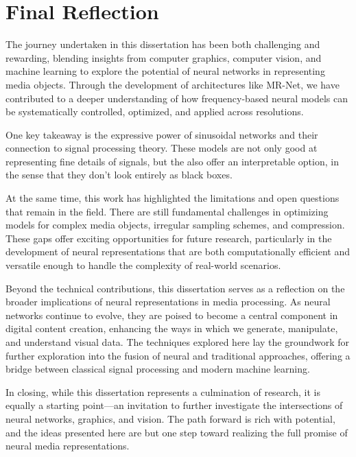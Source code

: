 \section{Final Reflection}

The journey undertaken in this dissertation has been both challenging and rewarding, blending insights from computer graphics, computer vision, and machine learning to explore the potential of neural networks in representing media objects. Through the development of architectures like MR-Net, we have contributed to a deeper understanding of how frequency-based neural models can be systematically controlled, optimized, and applied across resolutions.

One key takeaway is the expressive power of sinusoidal networks and their connection to signal processing theory. These models are not only good at representing fine details of signals, but the also offer an interpretable option, in the sense that they don't look entirely as black boxes.

At the same time, this work has highlighted the limitations and open questions that remain in the field. There are still fundamental challenges in optimizing models for complex media objects, irregular sampling schemes, and compression. These gaps offer exciting opportunities for future research, particularly in the development of neural representations that are both computationally efficient and versatile enough to handle the complexity of real-world scenarios.

Beyond the technical contributions, this dissertation serves as a reflection on the broader implications of neural representations in media processing. As neural networks continue to evolve, they are poised to become a central component in digital content creation, enhancing the ways in which we generate, manipulate, and understand visual data. The techniques explored here lay the groundwork for further exploration into the fusion of neural and traditional approaches, offering a bridge between classical signal processing and modern machine learning.

In closing, while this dissertation represents a culmination of research, it is equally a starting point—an invitation to further investigate the intersections of neural networks, graphics, and vision. The path forward is rich with potential, and the ideas presented here are but one step toward realizing the full promise of neural media representations.